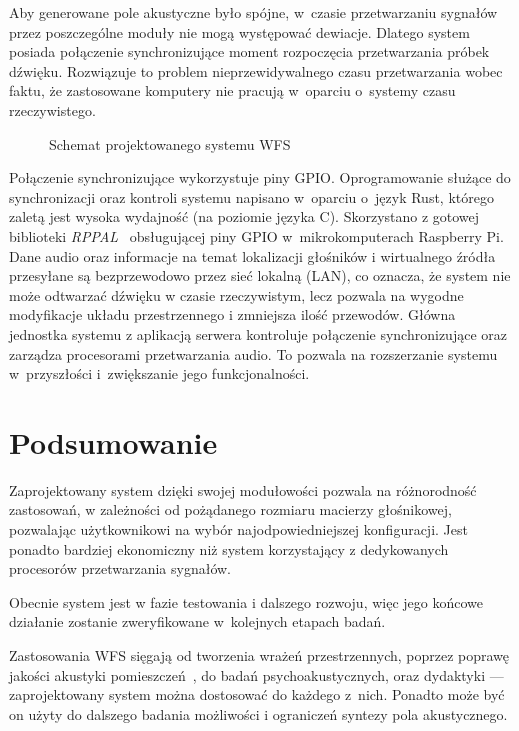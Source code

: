 \documentclass[10pt, a4paper]{article}
\let\Oldsection\section
\renewcommand{\section}{\FloatBarrier\Oldsection}
\begin{document}
Aby generowane pole akustyczne było spójne, w~czasie przetwarzaniu sygnałów przez
poszczególne moduły nie mogą występować dewiacje. Dlatego system posiada połączenie
synchronizujące moment rozpoczęcia przetwarzania próbek dźwięku.
Rozwiązuje to problem nieprzewidywalnego czasu przetwarzania wobec faktu, że
zastosowane komputery nie pracują w~oparciu o~systemy czasu rzeczywistego.

\begin{figure}[H]
  \centering
  \caption{Schemat projektowanego systemu WFS}
  \label{fig:schemat}
\end{figure}

Połączenie synchronizujące wykorzystuje piny GPIO. Oprogramowanie służące do
synchronizacji oraz kontroli systemu napisano w~oparciu o~język Rust, którego
zaletą jest wysoka wydajność (na poziomie języka C). Skorzystano z gotowej
biblioteki \emph{RPPAL}~\cite{RPPAL} obsługującej piny GPIO w~mikrokomputerach
Raspberry Pi. Dane audio oraz informacje na temat lokalizacji głośników i
wirtualnego źródła przesyłane są bezprzewodowo przez sieć lokalną (LAN), co
oznacza, że system nie może odtwarzać dźwięku w czasie rzeczywistym, lecz
pozwala na wygodne modyfikacje układu przestrzennego i zmniejsza ilość
przewodów. Główna jednostka systemu z aplikacją serwera kontroluje połączenie
synchronizujące oraz zarządza procesorami przetwarzania audio. To pozwala na rozszerzanie
systemu w~przyszłości i~zwiększanie jego funkcjonalności.

\section{Podsumowanie}

Zaprojektowany system dzięki swojej modułowości pozwala na różnorodność
zastosowań, w zależności od pożądanego rozmiaru macierzy głośnikowej,
pozwalając użytkownikowi na wybór najodpowiedniejszej konfiguracji. Jest
ponadto bardziej ekonomiczny niż system korzystający z dedykowanych procesorów
przetwarzania sygnałów.

Obecnie system jest w fazie testowania i dalszego rozwoju, więc jego końcowe
działanie zostanie zweryfikowane w~kolejnych etapach badań.

Zastosowania WFS sięgają od tworzenia wrażeń przestrzennych, poprzez poprawę
jakości akustyki pomieszczeń~\cite{enhancement}, do badań psychoakustycznych,
oraz dydaktyki --- zaprojektowany system można dostosować do każdego z~nich.
Ponadto może być on użyty do dalszego badania możliwości i ograniczeń syntezy
pola akustycznego.

\printbibliography
\end{document}
